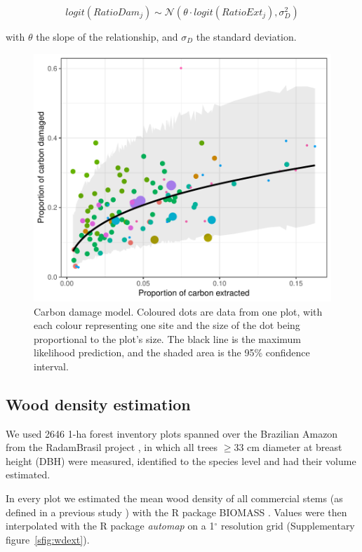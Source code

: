 \documentclass{article}
\begin{document}
\begin{equation}
logit(RatioDam_j) \sim \mathcal{N}(\theta \cdot logit(RatioExt_j), \sigma_D^2)
\end{equation} 

with $\theta$ the slope of the relationship, and $\sigma_D$ the standard deviation. 

\begin{figure}
    \centering
    \includegraphics[width=\linewidth]{graphs/damModel.pdf}
    \caption{Carbon damage model. Coloured dots are data from one plot, with each colour representing one site and the size of the dot being proportional to the plot's size. The black line is the maximum likelihood prediction, and the shaded area is the 95\% confidence interval.}
    \label{fig:damModel}
\end{figure}

\subsection{Wood density estimation}
\label{supmat:wdext}

We used 2646 1-ha forest inventory plots spanned over the Brazilian Amazon from the RadamBrasil project \cite{Radam2017}, in which all trees $\geq$33 cm diameter at breast height (DBH) were measured, identified to the species level and had their volume estimated. 

In every plot we estimated the mean wood density of all commercial stems (as defined in a previous study \cite{Piponiotc}) with the R package BIOMASS \cite{Rejou-Mechain2017}.
Values were then interpolated with the R package \textit{automap} \cite{gstat} on a 1$^{\circ}$ resolution grid (Supplementary figure~\ref{sfig:wdext}).
\end{document}
